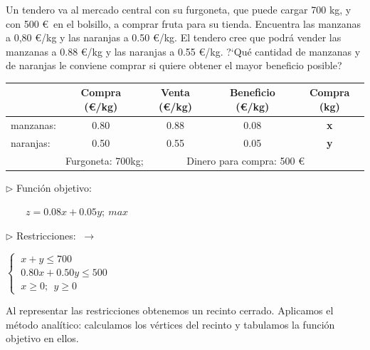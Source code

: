 \vspace{15mm}%
\begin{ejemplo}
\begin{ejer}
	Un tendero va al mercado central con su furgoneta, que puede cargar 700 kg, y con 500 \euro$\,$ en el bolsillo, a comprar fruta para su tienda. Encuentra las manzanas a 0,80 \euro/kg y las naranjas a 0.50 \euro/kg. El tendero cree que podrá vender las manzanas a 0.88 \euro/kg y las naranjas a 0.55 \euro/kg. ?`Qué cantidad de manzanas y de naranjas le conviene comprar si quiere obtener el mayor beneficio posible? 
\end{ejer}	
\end{ejemplo}
\vspace{7mm}%

\begin{table}[H]
\centering
\begin{tabular}{ccccc}
 & Compra (\euro/kg)& Venta (\euro/kg)& Beneficio (\euro/kg)& Compra (kg)\\ \hline
\multicolumn{1}{l}{manzanas:} & 0.80 & 0.88 & 0.08 & \textbf{x} \\
\multicolumn{1}{l}{naranjas:} & 0.50 & 0.55 & 0.05 & \textbf{y} \\ \hline
\multicolumn{5}{c}{Furgoneta: 700kg;  $\qquad \qquad  $Dinero para compra: 500 \euro}
\end{tabular}
\end{table}

\vspace{5mm}%
\begin{multicols}{2}

$\triangleright$ Función objetivo:

	$\qquad z=0.08x+0.05y; \ max $
	
$\triangleright$ Restricciones: $\ \to$

	$\begin{cases} \ x+y\le 700 \\ \ 0.80x+0.50y\le 500 \\ \ x\ge 0;\ \ y\ge 0 \end{cases}$
	
\end{multicols}

\vspace{5mm} %
Al representar las restricciones obtenemos un recinto cerrado. Aplicamos el método analítico: calculamos los vértices del recinto y tabulamos la función objetivo en ellos.

